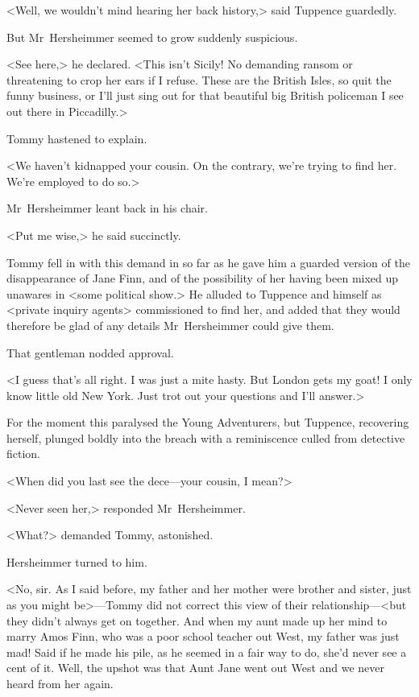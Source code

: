 <Well, we wouldn't mind hearing her back history,> said Tuppence guardedly.

But Mr~Hersheimmer seemed to grow suddenly suspicious.

<See here,> he declared. <This isn't Sicily! No demanding ransom or threatening to crop her ears if I refuse. These are the British Isles, so quit the funny business, or I'll just sing out for that beautiful big British policeman I see out there in Piccadilly.>

Tommy hastened to explain.

<We haven't kidnapped your cousin. On the contrary, we're trying to find her. We're employed to do so.>

Mr~Hersheimmer leant back in his chair.

<Put me wise,> he said succinctly.

Tommy fell in with this demand in so far as he gave him a guarded version of the disappearance of Jane Finn, and of the possibility of her having been mixed up unawares in <some political show.> He alluded to Tuppence and himself as <private inquiry agents> commissioned to find her, and added that they would therefore be glad of any details Mr~Hersheimmer could give them.

That gentleman nodded approval.

<I guess that's all right. I was just a mite hasty. But London gets my goat! I only know little old New York. Just trot out your questions and I'll answer.>

For the moment this paralysed the Young Adventurers, but Tuppence, recovering herself, plunged boldly into the breach with a reminiscence culled from detective fiction.

<When did you last see the dece—your cousin, I mean?>

<Never seen her,> responded Mr~Hersheimmer.

<What?> demanded Tommy, astonished.

Hersheimmer turned to him.

<No, sir. As I said before, my father and her mother were brother and sister, just as you might be>—Tommy did not correct this view of their relationship—<but they didn't always get on together. And when my aunt made up her mind to marry Amos Finn, who was a poor school teacher out West, my father was just mad! Said if he made his pile, as he seemed in a fair way to do, she'd never see a cent of it. Well, the upshot was that Aunt Jane went out West and we never heard from her again.

